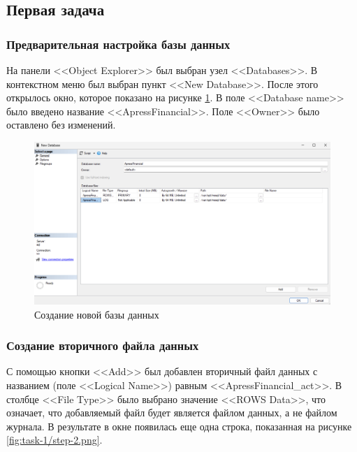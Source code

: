 \documentclass[a4paper, 14pt]{extarticle}
\begin{document}
\subsection{Первая задача}

\subsubsection{Предварительная настройка базы данных}

На панели <<Object Explorer>> был выбран узел <<Databases>>. В контекстном меню
был выбран пункт <<New Database>>. После этого открылось окно, которое показано
на рисунке \ref{fig:task-1/step-1.png}. В поле <<Database name>> было введено
название <<ApressFinancial>>. Поле <<Owner>> было оставлено без изменений.

\begin{figure}[H]
  \centering
  \includegraphics[width=\textwidth]{images/task-1/step-1.png}
  \caption{Создание новой базы данных}
  \label{fig:task-1/step-1.png}
\end{figure}

\subsubsection{Создание вторичного файла данных}

С помощью кнопки <<Add>> был добавлен вторичный файл данных с названием (поле
<<Logical Name>>) равным <<ApressFinancial\_act>>. В столбце <<File Type>> было
выбрано значение <<ROWS Data>>, что означает, что добавляемый файл будет
является файлом данных, а не файлом журнала. В результате в окне появилась еще
одна строка, показанная на рисунке \ref{fig:task-1/step-2.png}.
\end{document}
